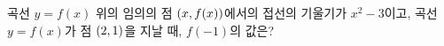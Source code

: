 곡선 $y=f(x)$ 위의 임의의 점 $(x{,}\mkern3mu\mathopen{}f(x))$에서의 접선의 기울기가 $x^2-3$이고, 곡선 $y=f(x)$가 점 $(2{,}\mkern3mu\mathopen{}1)$을 지날 때, $f(-1)$의 값은?
